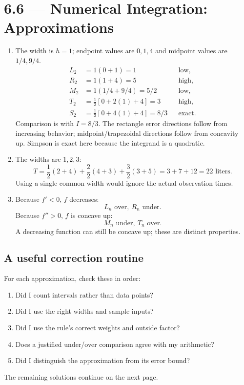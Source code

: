 \documentclass[11pt]{article}
\newcommand{\topic}[2]{\clearpage\section*{#1 --- #2}}
\begin{document}
\topic{6.6}{Numerical Integration: Approximations}
\begin{enumerate}
\item The width is $h=1$; endpoint values are $0,1,4$ and midpoint values are $1/4,9/4$.
\begin{align*}
L_2&=1(0+1)=\boxed1 &&\text{low},\\
R_2&=1(1+4)=\boxed5 &&\text{high},\\
M_2&=1(1/4+9/4)=\boxed{5/2} &&\text{low},\\
T_2&=\tfrac12[0+2(1)+4]=\boxed3 &&\text{high},\\
S_2&=\tfrac13[0+4(1)+4]=\boxed{8/3} &&\text{exact}.
\end{align*}
Comparison is with $I=8/3$. The rectangle error directions follow from increasing behavior; midpoint/trapezoidal directions follow from concavity up. Simpson is exact here because the integrand is a quadratic.
\item The widths are $1,2,3$:
\[
T=\frac12(2+4)+\frac22(4+3)+\frac32(3+5)
=3+7+12=\boxed{22\text{ liters}}.
\]
Using a single common width would ignore the actual observation times.
\item Because $f'<0$, $f$ decreases:
\[\boxed{L_n\text{ over},\ R_n\text{ under}}.\]
Because $f''>0$, $f$ is concave up:
\[\boxed{M_n\text{ under},\ T_n\text{ over}}.\]
A decreasing function can still be concave up; these are distinct properties.
\end{enumerate}

\subsection*{A useful correction routine}
For each approximation, check these in order:
\begin{enumerate}[label=\arabic*.]
\item Did I count intervals rather than data points?
\item Did I use the right widths and sample inputs?
\item Did I use the rule's correct weights and outside factor?
\item Does a justified under/over comparison agree with my arithmetic?
\item Did I distinguish the approximation from its error bound?
\end{enumerate}
The remaining solutions continue on the next page.
\end{document}
